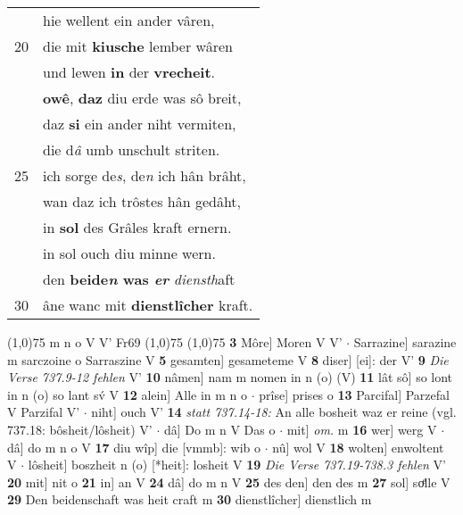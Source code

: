 \documentclass[8pt,a4paper,notitlepage]{article}
\begin{document}
\begin{table}[ht]
\begin{minipage}[t]{0.5\linewidth}
\begin{tabular}{rl}
 & hie wellent ein ander vâren,\\ 
20 & die mit \textbf{kiusche} lember wâren\\ 
 & und lewen \textbf{in} der \textbf{vrecheit}.\\ 
 & \textbf{owê}, \textbf{daz} diu erde was sô breit,\\ 
 & daz \textbf{si} ein ander niht vermiten,\\ 
 & die d\textit{â} umb unschult striten.\\ 
25 & ich sorge de\textit{s}, de\textit{n} ich hân brâht,\\ 
 & wan daz ich trôstes hân gedâht,\\ 
 & in \textbf{sol} des Grâles kraft ernern.\\ 
 & in sol ouch diu minne wern.\\ 
 & den \textbf{beide\textit{n} was \textit{er}} \textit{diensth}aft\\ 
30 & âne wanc mit \textbf{dienstlîcher} kraft.\\ 
\end{tabular}
\scriptsize
\line(1,0){75} \newline
m n o V V' Fr69 \newline
\line(1,0){75} \newline
\newline
\line(1,0){75} \newline
\textbf{3} Môre] Moren V V'  $\cdot$ Sarrazine] sarazine m sarczoine o Sarraszine V \textbf{5} gesamten] gesameteme V \textbf{8} diser] [ei]: der V' \textbf{9} \textit{Die Verse 737.9-12 fehlen} V'  \textbf{10} nâmen] nam m nomen in n (o) (V) \textbf{11} lât sô] so lont in n (o) so lant sv́ V \textbf{12} alein] Alle in m n o  $\cdot$ prîse] prises o \textbf{13} Parcifal] Parzefal V Parzifal V'  $\cdot$ niht] ouch V' \textbf{14} \textit{statt 737.14-18:} An alle bosheit waz er reine (vgl. 737.18: bôsheit/lôsheit) V'   $\cdot$ dâ] Do m n V Das o  $\cdot$ mit] \textit{om.} m \textbf{16} wer] werg V  $\cdot$ dâ] do m n o V \textbf{17} diu wîp] die [vmmb]: wib o  $\cdot$ nû] wol V \textbf{18} wolten] enwoltent V  $\cdot$ lôsheit] boszheit n (o) [*heit]: losheit  V \textbf{19} \textit{Die Verse 737.19-738.3 fehlen} V'  \textbf{20} mit] nit o \textbf{21} in] an V \textbf{24} dâ] do m n V \textbf{25} des den] den des m \textbf{27} sol] soͤlle V \textbf{29} Den beidenschaft was heit craft m \textbf{30} dienstlîcher] dienstlich m \newline
\end{minipage}
\end{table}
\end{document}
